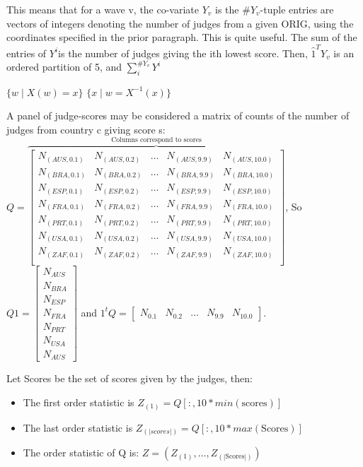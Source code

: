 \documentclass{article}
\begin{document}
This means that for a wave v, the co-variate $Y_v$ is the $\#Y_v$-tuple entries are vectors of integers denoting the number of judges from a given ORIG, using the coordinates specified in the prior paragraph. This is quite useful. The sum of the entries of $Y^i$is the number of judges giving the ith lowest score. Then, $\hat{1}^T Y_v$ is an ordered partition of 5, and $\sum_i^{\#Y_v} Y^i$


$ \{w \mid X(w) = x \} $
$ \{x \mid w = X^{-1}(x) \}$

A panel of judge-scores may be considered a matrix of counts of the number of judges from country c giving score s:
$ Q = \overbrace{\begin{bmatrix}
N_{(AUS,0.1)} & N_{(AUS,0.2)} & \dots & N_{(AUS,9.9)} & N_{(AUS,10.0)} \\
N_{(BRA,0.1)} & N_{(BRA,0.2)} & \dots & N_{(BRA,9.9)} & N_{(BRA,10.0)} \\
N_{(ESP,0.1)} & N_{(ESP,0.2)} & \dots & N_{(ESP,9.9)} & N_{(ESP,10.0)} \\
N_{(FRA,0.1)} & N_{(FRA,0.2)} & \dots & N_{(FRA,9.9)} & N_{(FRA,10.0)} \\
N_{(PRT,0.1)} & N_{(PRT,0.2)} & \dots & N_{(PRT,9.9)} & N_{(PRT,10.0)} \\
N_{(USA,0.1)} & N_{(USA,0.2)} & \dots & N_{(USA,9.9)} & N_{(USA,10.0)} \\
N_{(ZAF,0.1)} & N_{(ZAF,0.2)} & \dots & N_{(ZAF,9.9)} & N_{(ZAF,10.0)} \\
\end{bmatrix}}^{\text{Columns correspond to scores}}$, So $Q 1 = \begin{bmatrix}N_{AUS}\\ N_{BRA}\\N_{ESP}\\ N_{FRA}\\ N_{PRT}\\ N_{USA}\\N_{AUS}  \end{bmatrix}$ 
and $1^t Q = \begin{bmatrix} N_{0.1} & N_{0.2} & \dots & N_{9.9} & N_{10.0}\end{bmatrix}$.

Let Scores be the set of scores given by the judges, then:
\begin{itemize}
\item The first order statistic is $Z_{(1)} = Q[:,10*min(\text{scores})]$
\item The last order statistic is $Z_{(|scores|)} = Q[:,10*max(\text{Scores})]$
\item The order statistic of Q is: $Z = (Z_{(1)},\dots, Z_{(|\text{Scores}|)}) $
\end{itemize}
\end{document}
